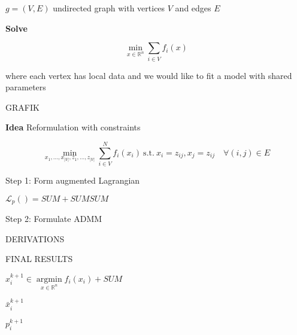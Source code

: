 $g=(V,E)$ undirected graph with vertices $V$ and edges $E$

\textbf{Solve}

$$	\min_{x \in \mathbb{R}^{n}} \sum_{i\in V} f_i(x) $$

where each vertex has local data and we would like to fit a model with shared parameters

GRAFIK

\textbf{Idea} Reformulation with constraints

$$\min_{x_1,\dots,x_{|V|}, z_1,\dots,z_{|V|}} \sum_{i\in V}^{N} f_i(x_i)\ \text{s.t.}\ x_i=z_{ij}, x_j=z_{ij}\quad \forall(i,j)\in E$$

Step 1: Form augmented Lagrangian

$\mathcal{L}_p()=SUM+SUMSUM$

Step 2: Formulate ADMM

DERIVATIONS

FINAL RESULTS

$x_i^{k+1} \in \underset{x \in \mathbb{R}^{n}}{\operatorname{argmin}}f_i(x_i)+SUM$

$\bar{x}_i^{k+1}$

$p_i^{k+1}$
